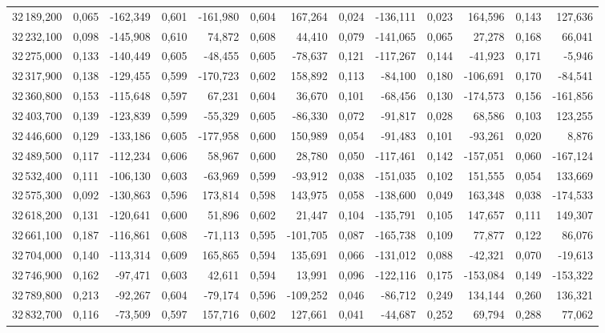 \begin{longtable}{rrrrrrrrrrrrr}
32\,189,200 & 0,065 & -162,349 & 0,601 & -161,980 & 0,604 & 167,264 & 0,024 & -136,111 & 0,023 & 164,596 & 0,143 & 127,636\\
32\,232,100 & 0,098 & -145,908 & 0,610 & 74,872 & 0,608 & 44,410 & 0,079 & -141,065 & 0,065 & 27,278 & 0,168 & 66,041\\
32\,275,000 & 0,133 & -140,449 & 0,605 & -48,455 & 0,605 & -78,637 & 0,121 & -117,267 & 0,144 & -41,923 & 0,171 & -5,946\\
32\,317,900 & 0,138 & -129,455 & 0,599 & -170,723 & 0,602 & 158,892 & 0,113 & -84,100 & 0,180 & -106,691 & 0,170 & -84,541\\
32\,360,800 & 0,153 & -115,648 & 0,597 & 67,231 & 0,604 & 36,670 & 0,101 & -68,456 & 0,130 & -174,573 & 0,156 & -161,856\\
32\,403,700 & 0,139 & -123,839 & 0,599 & -55,329 & 0,605 & -86,330 & 0,072 & -91,817 & 0,028 & 68,586 & 0,103 & 123,255\\
32\,446,600 & 0,129 & -133,186 & 0,605 & -177,958 & 0,600 & 150,989 & 0,054 & -91,483 & 0,101 & -93,261 & 0,020 & 8,876\\
32\,489,500 & 0,117 & -112,234 & 0,606 & 58,967 & 0,600 & 28,780 & 0,050 & -117,461 & 0,142 & -157,051 & 0,060 & -167,124\\
32\,532,400 & 0,111 & -106,130 & 0,603 & -63,969 & 0,599 & -93,912 & 0,038 & -151,035 & 0,102 & 151,555 & 0,054 & 133,669\\
32\,575,300 & 0,092 & -130,863 & 0,596 & 173,814 & 0,598 & 143,975 & 0,058 & -138,600 & 0,049 & 163,348 & 0,038 & -174,533\\
32\,618,200 & 0,131 & -120,641 & 0,600 & 51,896 & 0,602 & 21,447 & 0,104 & -135,791 & 0,105 & 147,657 & 0,111 & 149,307\\
32\,661,100 & 0,187 & -116,861 & 0,608 & -71,113 & 0,595 & -101,705 & 0,087 & -165,738 & 0,109 & 77,877 & 0,122 & 86,076\\
32\,704,000 & 0,140 & -113,314 & 0,609 & 165,865 & 0,594 & 135,691 & 0,066 & -131,012 & 0,088 & -42,321 & 0,070 & -19,613\\
32\,746,900 & 0,162 & -97,471 & 0,603 & 42,611 & 0,594 & 13,991 & 0,096 & -122,116 & 0,175 & -153,084 & 0,149 & -153,322\\
32\,789,800 & 0,213 & -92,267 & 0,604 & -79,174 & 0,596 & -109,252 & 0,046 & -86,712 & 0,249 & 134,144 & 0,260 & 136,321\\
32\,832,700 & 0,116 & -73,509 & 0,597 & 157,716 & 0,602 & 127,661 & 0,041 & -44,687 & 0,252 & 69,794 & 0,288 & 77,062\\

\end{longtable}
